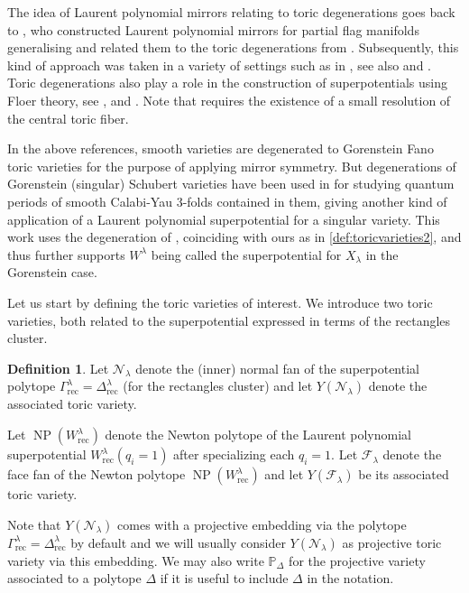 \documentclass{amsart}
\theoremstyle{definition}
\newtheorem{defn}[thm]{Definition}
\numberwithin{equation}{section}
\newcommand{\FF}{\mathcal{F}}
\newcommand{\CC}{\mathcal{N}}
\newcommand{\rect}{\mathrm{rec}}
\newcommand{\NP}{\operatorname{NP}}
\begin{document}
The idea of Laurent polynomial mirrors  relating to toric degenerations goes back to \cite{BC-FKvSGrass,BC-FKvS}, who constructed Laurent polynomial mirrors for partial flag manifolds generalising  \cite{EHX,Givental:fullflag} and related them to the toric degenerations from \cite{GL}. Subsequently, 
this kind of approach was taken in a variety of settings such as in  \cite{Galkin,ILP, Kalashnikov}, see also \cite[Conjecture 9]{KP:whyandhow} and \cite{CKPT}. Toric degenerations also play a role in the construction of superpotentials using Floer theory, see \cite[Theorem~1]{Nishinou}, and \cite[Theorem 4.4]
{BGM22}. Note that \cite[Theorem~1]{Nishinou} requires the existence of a small resolution of the central toric fiber.  

In the above references, smooth 
varieties are degenerated to Gorenstein Fano toric varieties for the
purpose of applying mirror symmetry. 
But degenerations of Gorenstein (singular) Schubert varieties have been used in \cite{Miura:minuscule} for studying quantum periods of smooth Calabi-Yau $3$-folds contained in them, giving another kind of application of a Laurent 
polynomial superpotential for a singular variety. This work uses the degeneration of \cite{GL}, coinciding with ours as in  \cref{def:toricvarieties2}, and thus further supports $W^\lambda$ being called the superpotential for $X_\lambda$ in the Gorenstein case. 

 

Let us start by 
defining the toric varieties of interest.  
We introduce two toric varieties, both related to the superpotential 
expressed in terms of the rectangles cluster.

\begin{defn}\label{def:toricvarieties}
Let 
$\CC_\lambda$ denote the (inner) normal fan of the superpotential 
polytope $\Gamma_{\rect}^{\lambda} = \Delta^\lambda_\rect$ (for the rectangles cluster)
and let $Y(\CC_\lambda)$ denote the associated toric variety. 

Let $\NP(W^{\lambda}_{\rect})$ denote 
the Newton polytope of the Laurent polynomial  superpotential
$W_{\rect}^{\lambda}(q_i=1)$
after specializing
each $q_i=1$.
Let $\FF_\lambda$ denote the face fan 
of the Newton polytope 
$\NP(W^\lambda_{\rect})$ 
and let 
$Y(\FF_\lambda)$ be its associated toric variety.

Note that $Y(\CC_\lambda)$ comes with a projective embedding via the polytope $\Gamma_{\rect}^{\lambda} = \Delta^\lambda_\rect$ by default and we will usually consider $Y(\CC_\lambda)$ as projective toric variety via this embedding. We may also write $\mathbb P_{\Delta}$ for the projective variety associated to a polytope $\Delta$ if it is useful to include $\Delta$ in the notation. 
\end{defn}
\end{document}
